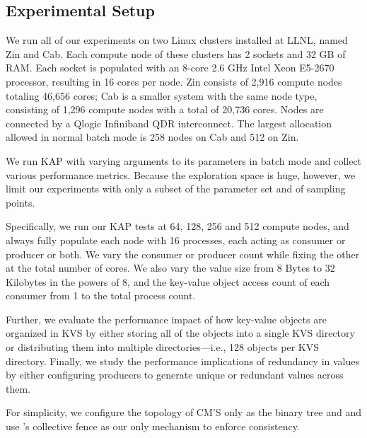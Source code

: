 \subsection{Experimental Setup}
We run all of our experiments on two Linux clusters installed at LLNL,
named Zin and Cab.
Each compute node of these clusters has 2 sockets and 32 GB of RAM.
Each socket is populated with an 8-core 2.6 GHz Intel
Xeon E5-2670 processor, resulting in 16 cores per node.
Zin consists of 2,916 compute nodes totaling 46,656 cores;
Cab is a smaller system with the same node type,
consisting of 1,296 compute nodes with a total of 20,736 cores.
Nodes are connected by a Qlogic Infiniband QDR interconnect.
The largest allocation allowed in normal batch mode
is 258 nodes on Cab and 512 on Zin.

We run KAP with varying arguments to its parameters
in batch mode and collect various 
performance metrics. 
Because the exploration
space is huge, however, we limit our experiments with
only a subset of the parameter set and of sampling points.

Specifically, we run our KAP tests at 64, 128, 256 and 512
compute nodes, and always fully populate each node with
16 processes, each acting as consumer or producer or
both. We vary the consumer or producer count
while fixing the other at the total number of cores.
We also vary the value size 
from 8 Bytes to 32 Kilobytes in the powers of 8,
and the key-value object access count of each consumer
from 1 to the total process count.

Further, we evaluate the performance impact 
of how key-value objects are organized 
in KVS by either storing all of the objects into a single KVS directory
or distributing them into multiple directories---i.e.,
128 objects per KVS directory.
Finally, we study the performance implications of 
redundancy in values by either configuring producers to generate
unique or redundant values across them.

For simplicity, we configure the topology of CM'S only as 
the binary tree and and use \flux's collective fence 
as our only mechanism to enforce consistency.
